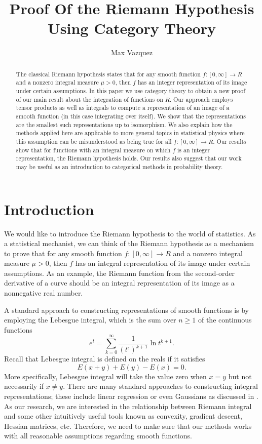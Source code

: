 \documentclass[a4paper,reqno,oneside]{article}
\begin{document}
\title{Proof Of the Riemann Hypothesis Using Category Theory}
\author{Max Vazquez}
\maketitle


\begin{abstract} The classical Riemann hypothesis states that for any smooth function $f: [0, \infty] \to R$ and a nonzero integral measure $\mu > 0$, then $f$ has an integer representation of its image under certain assumptions. In this paper we use category theory to obtain a new proof of our main result about the integration of functions on $R$. Our approach employs tensor products as well as integrals to compute a representation of an image of a smooth function (in this case integrating over itself). We show that the representations are the smallest such representations up to isomorphism. We also explain how the methods applied here are applicable to more general topics in statistical physics where this assumption can be misunderstood as being true for all $f: [0, \infty] \to R$. Our results show that for functions with an integral measure on which $f$ is an integer representation, the Riemann hypothesis holds. Our results also suggest that our work may be useful as an introduction to categorical methods in probability theory.
\end{abstract}

\tableofcontents
\newpage


\section*{Introduction} %
We would like to introduce the Riemann hypothesis to the world of statistics. As a statistical mechanist, we can think of the Riemann hypothesis as a mechanism to prove that for any smooth function $f:[0,\infty]\to R$ and a nonzero integral measure $\mu > 0$, then $f$ has an integral representation of its image under certain assumptions. As an example, the Riemann function from the second-order derivative of a curve should be an integral representation of its image as a nonnegative real number. 

A standard approach to constructing representations of smooth functions is by employing the Lebesgue integral, which is the sum over $n\geq 1$ of the continuous functions
\[
e^t = \sum_{k=0}^{\infty}\frac{1}{(t^\epsilon)^{k+1}}\ln t^{k+1}.
\]
Recall that Lebesgue integral is defined on the reals if it satisfies
\[
E(x+y) + E(y)-E(x) = 0.
\]
More specifically, Lebesgue integral will take the value zero when $x=y$ but not necessarily if $x\neq y$. There are many standard approaches to constructing integral representations; these include linear regression or even Gaussians as discussed in \cite{Mackey}. As our research, we are interested in the relationship between Riemann integral and some other intuitively useful tools known as convexity, gradient descent, Hessian matrices, etc. Therefore, we need to make sure that our methods works with all reasonable assumptions regarding smooth functions.
\end{document}
